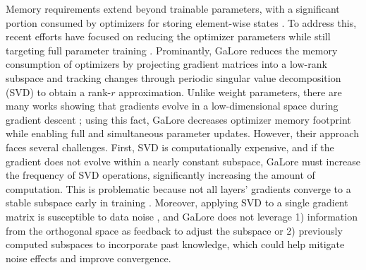 Memory requirements extend beyond trainable parameters, with a significant portion consumed by optimizers for storing element-wise states \citep{zhao2024galorememoryefficientllmtraining}. To address this, recent efforts have focused on reducing the optimizer parameters while still targeting full parameter training \citep{li2023memoryefficientoptimizers4bit, anil2019memoryefficientadaptiveoptimization, lv-etal-2024-full, dettmers20228bitoptimizersblockwisequantization, zhang2024adamminiusefewerlearning, modoranu2024microadamaccurateadaptiveoptimization, zhao2024galorememoryefficientllmtraining, muhamed2024grasscomputeefficientlowmemory}.
Prominantly, GaLore \citep{zhao2024galorememoryefficientllmtraining} reduces the memory consumption of optimizers by projecting gradient matrices into a low-rank subspace and tracking changes through periodic singular value decomposition (SVD) to obtain a rank-\(r\) approximation. Unlike weight parameters, there are many works showing that gradients evolve in a low-dimensional space during gradient descent \citep{gurari2018gradientdescenthappenstiny, schneider2024identifyingpolicygradientsubspaces, yaras2023invariant}; using this fact, GaLore decreases optimizer memory footprint while enabling full and simultaneous parameter updates. 
However, their approach faces several challenges. First, SVD is computationally expensive, and if the gradient does not evolve within a nearly constant subspace, GaLore must increase the frequency of SVD operations, significantly increasing the amount of computation. This is problematic because not all layers’ gradients converge to a stable subspace early in training \citep{jaiswal2024galorewelorelowrankweights}. Moreover, applying SVD to a single gradient matrix is susceptible to data noise \citep{Vaswani_2018}, and GaLore does not leverage 1) information from the orthogonal space as feedback to adjust the subspace \citep{modoranu2024microadamaccurateadaptiveoptimization} or 2) previously computed subspaces to incorporate past knowledge, which could help mitigate noise effects and improve convergence. 

